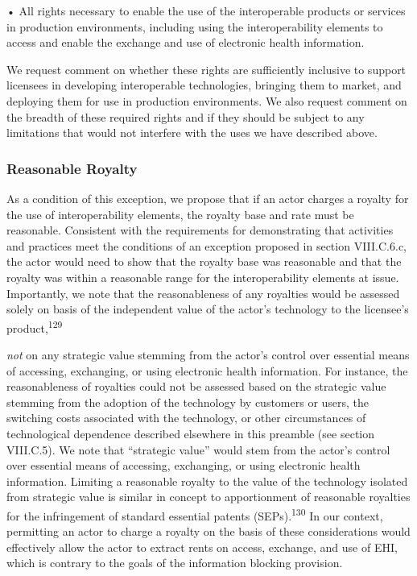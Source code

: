 \documentclass[twoside,11pt]{article}
\begin{document}
          • All rights necessary to enable the use of the interoperable products or services in production environments,  \ifhmode\expandafter\xspace\fi including using the interoperability elements to access and enable the exchange and use of electronic health information.


          We request comment on whether these rights are sufficiently inclusive to support licensees in developing interoperable technologies, bringing them to market, and deploying them for use in production environments. We also request comment on the breadth of these required rights and if they should be subject to any limitations that would not interfere with the uses we have described above.


          \subsubsection{Reasonable Royalty}

          As a condition of this exception, we propose that if an actor charges a royalty for the use of interoperability elements, the royalty base and rate must be reasonable. Consistent with the requirements for demonstrating that activities and practices meet the conditions of an exception proposed in section VIII.C.6.c, the actor would need to show that the royalty base was reasonable and that the royalty was within a reasonable range for the interoperability elements at issue. Importantly, we note that the reasonableness of any royalties would be assessed solely on basis of the independent value of the actor's technology to the licensee's product,\textsuperscript{129}
            
            \emph{not} on any strategic value stemming from the actor's control over essential means of accessing, exchanging, or using electronic health information. For instance, the reasonableness of royalties could not be assessed based on the strategic value stemming from the adoption of the technology by customers or users, the switching costs associated with the technology, or other circumstances of technological dependence described elsewhere in this preamble (see section VIII.C.5). We note that “strategic value” would stem from the actor's control over essential means of accessing, exchanging, or using electronic health information. Limiting a reasonable royalty to the value of the technology isolated from strategic value is similar in concept to apportionment of reasonable royalties for the infringement of standard essential patents (SEPs).\textsuperscript{130}
             In our context, permitting an actor to charge a royalty on the basis of these considerations would effectively allow the actor to extract rents on access, exchange, and use of EHI, which is contrary to the goals of the information blocking provision.
\end{document}

